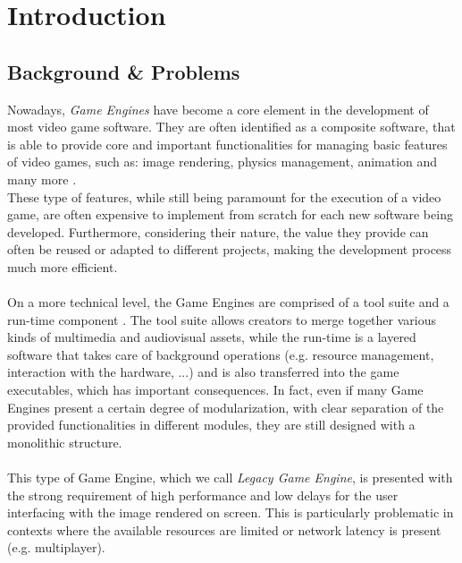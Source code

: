
\chapter{Introduction}
\label{cap:introduction}

\section{Background \& Problems}
Nowadays, \textit{Game Engines} have become a core element in the development of most video game software. They are often identified as a composite software, that is able to provide core and important functionalities for managing basic features of video games, such as: image rendering, physics management, animation and many more \cite{site:game-engine-wiki, womak:game-engines-survey}. \\
These type of features, while still being paramount for the execution of a video game, are often expensive to implement from scratch for each new software being developed. Furthermore, considering their nature, the value they provide can often be reused or adapted to different projects, making the development process much more efficient. \\ \\
On a more technical level, the Game Engines are comprised of a tool suite and a run-time component \cite{womak:gregory-game-engine}. The tool suite allows creators to merge together various kinds of multimedia and audiovisual assets, while the run-time is a layered software that takes care of background operations (e.g. resource management, interaction with the hardware, ...) and is also transferred into the game executables, which has important consequences. In fact, even if many Game Engines present a certain degree of modularization, with clear separation of the provided functionalities in different modules, they are still designed with a monolithic structure. \\ \\
This type of Game Engine, which we call \textit{Legacy Game Engine}, is presented with the strong requirement of high performance and low delays for the user interfacing with the image rendered on screen. This is particularly problematic in contexts where the available resources are limited or network latency is present (e.g. multiplayer). \\
